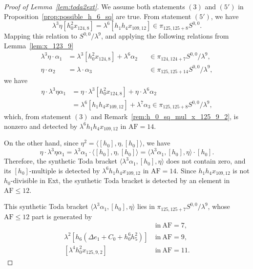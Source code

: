 \documentclass{amsart}
\numberwithin{equation}{section}
\newcommand{\AF}{\mathrm{AF}}
\begin{document}
\begin{proof}[Proof of Lemma~\ref{lem:toda2ext}]
    We assume both statements $(3)$ and $(5')$ in Proposition~\ref{prop:possible_h_6_sq} are true. From statement $(5')$, we have 
    $$\lambda^3 \eta [h_0^2x_{124,8}] = \lambda^6 [h_1h_4x_{109,12}] \in \pi_{125,125+8} S^{0,0}.$$
Mapping this relation to $S^{0,0}/\lambda^9$, and applying the following relations from Lemma~\ref{lem:x_123_9}
\begin{align*}
        \lambda^3 \eta \cdot \alpha_1 & = \lambda^3 [h_0^2 x_{124,8}] + 
\lambda^6 \alpha_2 && \in \pi_{124,124+7} S^{0,0}/\lambda^9,\\
\eta \cdot \alpha_2 & = \lambda \cdot \alpha_3 && \in \pi_{125,125+14} S^{0,0}/\lambda^9,
    \end{align*}
we have
\begin{align*}
    \eta \cdot \lambda^3 \eta \alpha_1 & = \eta \cdot \lambda^3 [h_0^2 x_{124,8}] + \eta \cdot \lambda^6 \alpha_2\\
   & = \lambda^6 [h_1h_4x_{109,12}] + \lambda^7 \alpha_3 \in \pi_{125,125+8} S^{0,0}/\lambda^9,
 \end{align*}
 which, from statement $(3)$ and Remark~\ref{rem:h_0_sq_mul_x_125_9_2}, is nonzero and detected by $\lambda^6 h_1h_4x_{109,12}$ in $\AF=14$.
 
 On the other hand, since $\eta^2 = \langle [h_0], \eta, [h_0] \rangle$, we have
 $$\eta \cdot \lambda^3 \eta \alpha_1 = \lambda^3 \alpha_1 \cdot \langle [h_0], \eta, [h_0] \rangle = \langle \lambda^3 \alpha_1, [h_0], \eta \rangle \cdot [h_0].$$
 Therefore, the synthetic Toda bracket
$\langle \lambda^3 \alpha_1, [h_0], \eta \rangle$
    does not contain zero, and its $[h_0]$-multiple is detected by $\lambda^6 h_1h_4x_{109,12}$ in $\AF=14$. Since $h_1h_4x_{109,12}$ is not $h_0$-divisible in Ext, the synthetic Toda bracket is detected by an element in $\AF \le 12$.
    

This synthetic Toda bracket $\langle \lambda^3 \alpha_1, [h_0], \eta \rangle$ lies in $\pi_{125,125+7} S^{0,0}/\lambda^9$, whose $\AF \le 12$ part is generated by
\begin{align*}
[h_0^2 x_{125,5}] \ & \text{in} \ \AF=7,\\ 
\lambda^2 [h_6(\Delta e_1 +C_0+h_0^6h_5^2)] \ & \text{in} \ \AF=9,\\ 
[\lambda^4 h_0^2 x_{125,9,2}] \ & \text{in} \ \AF=11.
\end{align*}



\end{proof}
\end{document}
